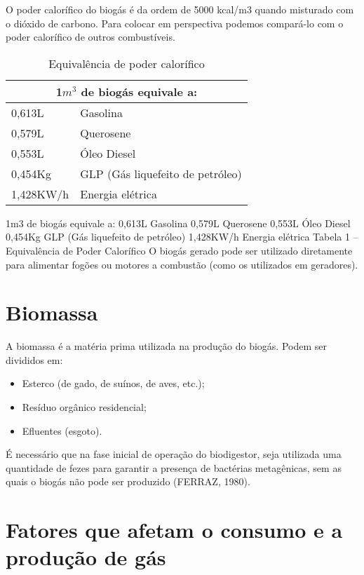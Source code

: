 O poder calorífico do biogás é da ordem de 5000 kcal/m3 quando misturado com o dióxido de carbono. Para colocar em perspectiva podemos compará-lo com o poder calorífico de outros combustíveis.

\begin{table}[htb]
\centering
\footnotesize
\begin{tabular}{ll}
\toprule
\multicolumn{2}{c}{\textbf{1$m^3$ de biogás equivale a:}} \\
\midrule \midrule
0,613L & Gasolina \\
\midrule 
0,579L & Querosene \\
\midrule 
0,553L & Óleo Diesel \\
\midrule 
0,454Kg & GLP (Gás liquefeito de petróleo) \\
\midrule 
1,428KW/h & Energia elétrica \\
\bottomrule
\end{tabular}%
\caption{Equivalência de poder calorífico}
\end{table}

1m3 de biogás equivale a:
0,613L	Gasolina
0,579L	Querosene
0,553L	Óleo Diesel
0,454Kg	GLP (Gás liquefeito de petróleo)
1,428KW/h	Energia elétrica
Tabela 1 – Equivalência de Poder Calorífico
O biogás gerado pode ser utilizado diretamente para alimentar fogões ou motores a combustão (como os utilizados em geradores).

\section{Biomassa}

A biomassa é a matéria prima utilizada na produção do biogás. Podem ser divididos em:

\begin{itemize}
\item Esterco (de gado, de suínos, de aves, etc.);
\item Resíduo orgânico residencial;
\item Efluentes (esgoto).
\end{itemize}

É necessário que na fase inicial de operação do biodigestor, seja utilizada uma quantidade de fezes para garantir a presença de bactérias metagênicas, sem as quais o biogás não pode ser produzido (FERRAZ, 1980).

\section{Fatores que afetam o consumo e a produção de gás}

